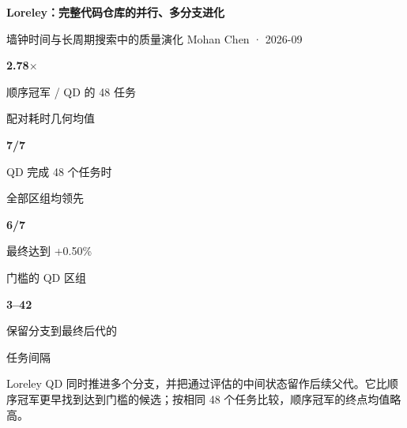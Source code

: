 \documentclass[UTF8,fontset=none,a4paper]{ctexart}
\newcommand{\metriccard}[3]{%
  \begin{minipage}[t][19mm][c]{0.235\textwidth}
    \centering
    {\color{#3}\fontsize{20}{21}\selectfont\bfseries #1}\par
    {\color{muted}\scriptsize #2}
  \end{minipage}%
}
\newcommand{\callout}[2]{%
  \colorbox{bluepale}{%
    \parbox{\dimexpr\linewidth-2\fboxsep\relax}{%
      \vspace{2pt}{\color{blue}\bfseries #1}\quad #2\vspace{2pt}%
    }%
  }%
}
\begin{document}

\thispagestyle{fancy}
\vspace*{-3mm}
{\color{ink}\fontsize{25}{27}\selectfont\bfseries
Loreley：完整代码仓库的并行、多分支进化}\par
\vspace{2pt}
{\color{muted}\fontsize{12}{14}\selectfont
墙钟时间与长周期搜索中的质量演化}\hfill
{\small Mohan Chen · 2026-09}\par
\vspace{5pt}

\colorbox{surface}{\parbox{\dimexpr\textwidth-2\fboxsep\relax}{%
\vspace{3pt}
\metriccard{2.78$\times$}{顺序冠军 / QD 的 48 任务\par 配对耗时几何均值}{blue}\hfill
\metriccard{7/7}{QD 完成 48 个任务时\par 全部区组均领先}{green}\hfill
\metriccard{6/7}{最终达到 +0.50\%\par 门槛的 QD 区组}{blue}\hfill
\metriccard{3--42}{保留分支到最终后代的\par 任务间隔}{orange}
\vspace{3pt}}}

\vspace{6pt}
\callout{主要结果}{Loreley QD 同时推进多个分支，并把通过评估的中间状态留作后续父代。它比顺序冠军更早找到达到门槛的候选；按相同 48 个任务比较，顺序冠军的终点均值略高。}
\end{document}
